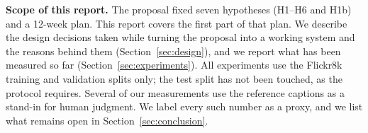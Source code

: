 \textbf{Scope of this report.} The proposal fixed seven hypotheses (H1--H6 and H1b) and a 12-week plan. This report covers the first part of that plan. We describe the design decisions taken while turning the proposal into a working system and the reasons behind them (Section~\ref{sec:design}), and we report what has been measured so far (Section~\ref{sec:experiments}). All experiments use the Flickr8k training and validation splits only; the test split has not been touched, as the protocol requires. Several of our measurements use the reference captions as a stand-in for human judgment. We label every such number as a proxy, and we list what remains open in Section~\ref{sec:conclusion}.
